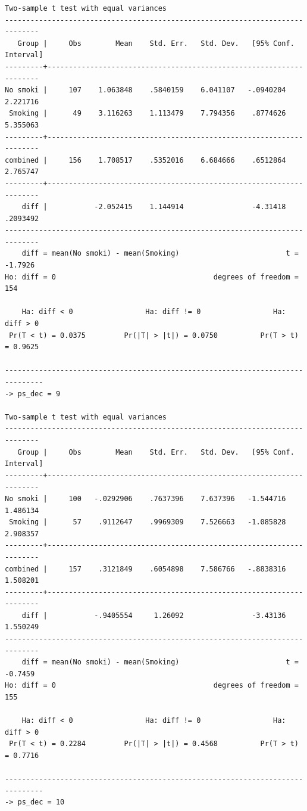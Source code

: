 \documentclass[
  10pt,
]{book}
\begin{document}
\begin{verbatim}
Two-sample t test with equal variances
------------------------------------------------------------------------------
   Group |     Obs        Mean    Std. Err.   Std. Dev.   [95% Conf. Interval]
---------+--------------------------------------------------------------------
No smoki |     107    1.063848    .5840159    6.041107   -.0940204    2.221716
 Smoking |      49    3.116263    1.113479    7.794356    .8774626    5.355063
---------+--------------------------------------------------------------------
combined |     156    1.708517    .5352016    6.684666    .6512864    2.765747
---------+--------------------------------------------------------------------
    diff |           -2.052415    1.144914                -4.31418    .2093492
------------------------------------------------------------------------------
    diff = mean(No smoki) - mean(Smoking)                         t =  -1.7926
Ho: diff = 0                                     degrees of freedom =      154

    Ha: diff < 0                 Ha: diff != 0                 Ha: diff > 0
 Pr(T < t) = 0.0375         Pr(|T| > |t|) = 0.0750          Pr(T > t) = 0.9625

-------------------------------------------------------------------------------
-> ps_dec = 9

Two-sample t test with equal variances
------------------------------------------------------------------------------
   Group |     Obs        Mean    Std. Err.   Std. Dev.   [95% Conf. Interval]
---------+--------------------------------------------------------------------
No smoki |     100   -.0292906    .7637396    7.637396   -1.544716    1.486134
 Smoking |      57    .9112647    .9969309    7.526663   -1.085828    2.908357
---------+--------------------------------------------------------------------
combined |     157    .3121849    .6054898    7.586766   -.8838316    1.508201
---------+--------------------------------------------------------------------
    diff |           -.9405554     1.26092                -3.43136    1.550249
------------------------------------------------------------------------------
    diff = mean(No smoki) - mean(Smoking)                         t =  -0.7459
Ho: diff = 0                                     degrees of freedom =      155

    Ha: diff < 0                 Ha: diff != 0                 Ha: diff > 0
 Pr(T < t) = 0.2284         Pr(|T| > |t|) = 0.4568          Pr(T > t) = 0.7716

-------------------------------------------------------------------------------
-> ps_dec = 10


\end{verbatim}
\end{document}
